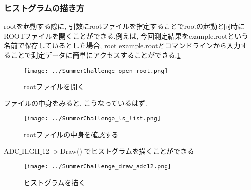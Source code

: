 \subsubsection{ヒストグラムの描き方}
rootを起動する際に, 引数にrootファイルを指定することでrootの起動と同時にROOTファイルを開くことができる.例えば, 今回測定結果をexample.rootという名前で保存しているとした場合, root example.rootとコマンドラインから入力することで測定データに簡単にアクセスすることができる.\ref{fig:open_ROOT}
\begin{figure}[h]
  \begin{center}
    \texttt{[image: ../SummerChallenge\_open\_root.png]}
    \caption{rootファイルを開く}
    \label{fig:open_ROOT}
  \end{center}
\end{figure}

ファイルの中身をみると, こうなっているはず.

\begin{figure}[h]
  \begin{center}
    \texttt{[image: ../SummerChallenge\_ls\_list.png]}
    \caption{rootファイルの中身を確認する}
    \label{fig:ls_ROOT}
  \end{center}
\end{figure}

ADC$\_$HIGH$\_$12-$>$Draw() でヒストグラムを描くことができる.

\begin{figure}[h]
  \begin{center}
    \texttt{[image: ../SummerChallenge\_draw\_adc12.png]}
    \caption{ヒストグラムを描く}
    \label{fig:ls_ROOT}
  \end{center}
\end{figure}

